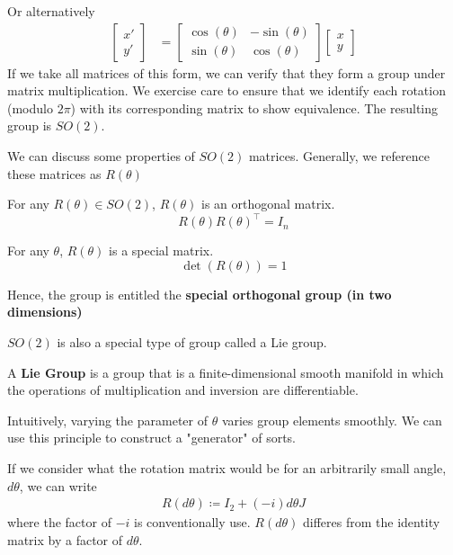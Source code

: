 \documentclass[compress,aspectratio=169,10pt,usenames,dvipsnames]{beamer}
\begin{document}
\begin{frame}
\vfill
Or alternatively
\vfill
\begin{equation}
	\begin{aligned}
		\begin{bmatrix}
			x' \\
			y'
		\end{bmatrix} &=
		\begin{bmatrix}
			\cos(\theta) & -\sin(\theta) \\
			\sin(\theta) & \cos(\theta)
		\end{bmatrix}
		\begin{bmatrix}
			x \\
			y
		\end{bmatrix}
	\end{aligned}
\end{equation}
\vfill
If we take all matrices of this form, we can verify that they form a group under matrix multiplication.
\vfill
We exercise care to ensure that we identify each rotation (modulo $2\pi$) with its corresponding matrix to show equivalence. The resulting group is $SO(2)$.
\end{frame}
%
%
\begin{frame}
\vfill
We can discuss some properties of $SO(2)$ matrices. Generally, we reference these matrices as $R(\theta)$
\vfill
\begin{theorem}
	For any $R(\theta)\in SO(2)$, $R(\theta)$ is an orthogonal matrix.
$$R(\theta)R(\theta)^\intercal=I_n$$
\end{theorem}
\vfill
\begin{theorem}
	For any $\theta$, $R(\theta)$ is a special matrix.
 $$\det(R(\theta))=1$$
\end{theorem}
\vfill
Hence, the group is entitled the \textbf{special orthogonal group (in two dimensions)}
\end{frame}
%
%
\begin{frame}
\vfill
$SO(2)$ is also a special type of group called a Lie group.
\vfill
\begin{definition}
	A \textbf{Lie Group} is a group that is a finite-dimensional smooth manifold in which the operations of multiplication and inversion are differentiable.
\end{definition}
\vfill
Intuitively, varying the parameter of $\theta$ varies group elements smoothly. We can use this principle to construct a "generator" of sorts.
\vfill
\end{frame}
%
%
\begin{frame}
\vfill
If we consider what the rotation matrix would be for an arbitrarily small angle, $d\theta$, we can write 
\vfill
\begin{equation}
	\begin{aligned}
		R(d\theta) \coloneq I_2 + (-i)d\theta  J
	\end{aligned}
\end{equation}  
\vfill
where the factor of $-i$ is conventionally use.
\vfill
$R(d\theta)$ differes from the identity matrix by a factor of $d\theta$.
\end{frame}
\end{document}
